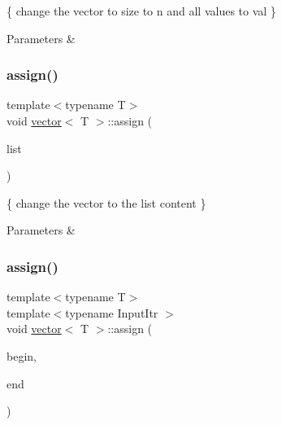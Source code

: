 \{ change the vector to size to n and all values to val \} 


\begin{DoxyParams}{Parameters}
{\em } & \\
\hline
\end{DoxyParams}
\mbox{\label{classvector_a31411e4da5fa0fa860aec7377639344e}} 
\subsubsection{\texorpdfstring{assign()}{assign()}\hspace{0.1cm}{\footnotesize\ttfamily [2/3]}}
{\footnotesize\ttfamily template$<$typename T$>$ \\
void \hyperlink{classvector}{vector}$<$ T $>$\+::assign (\begin{DoxyParamCaption}\item[{const std\+::initializer\+\_\+list$<$ T $>$ \&}]{list }\end{DoxyParamCaption})\hspace{0.3cm}{\ttfamily [inline]}}



\{ change the vector to the list content \} 


\begin{DoxyParams}{Parameters}
{\em } & \\
\hline
\end{DoxyParams}
\mbox{\label{classvector_af44f287e086f504b0ec06ffe8cdf96e3}} 
\subsubsection{\texorpdfstring{assign()}{assign()}\hspace{0.1cm}{\footnotesize\ttfamily [3/3]}}
{\footnotesize\ttfamily template$<$typename T$>$ \\
template$<$typename Input\+Itr $>$ \\
void \hyperlink{classvector}{vector}$<$ T $>$\+::assign (\begin{DoxyParamCaption}\item[{Input\+Itr}]{begin,  }\item[{Input\+Itr}]{end }\end{DoxyParamCaption})\hspace{0.3cm}{\ttfamily [inline]}}



